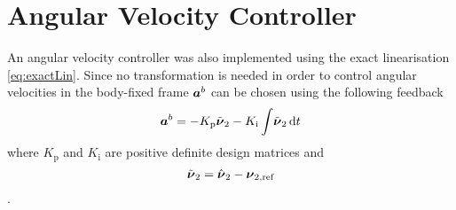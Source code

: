 \section{Angular Velocity Controller}  
An angular velocity controller was also implemented using the exact linearisation \eqref{eq:exactLin}.
Since no transformation is needed in order to control angular velocities in the body-fixed frame
$\accVector^b$ can be chosen using the following \abbrPI feedback 
\begin{equation}
	\accVector^b =-K_{\text{p}} \nuTildeAng - K_{\text{i}}\int \! \nuTildeAng \, \mathrm{d}t
\end{equation}
where $K_{\text{p}}$ and $K_{\text{i}}$ are positive definite design matrices and 
\begin{equation}
\nuTildeAng = \hat{\nuVector}_2 - \nuVectorAng[,{\text{ref}}]
\end{equation} \citep[p. 453]{fossen2011}.

